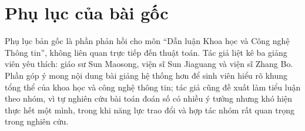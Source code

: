 \documentclass[11pt]{article}
\begin{document}
\appendix
\section{Phụ lục của bài gốc}

Phụ lục bản gốc là phần phản hồi cho môn ``Dẫn luận Khoa học và Công nghệ
Thông tin'', không liên quan trực tiếp đến thuật toán. Tác giả liệt kê ba
giảng viên yêu thích: giáo sư Sun Maosong, viện sĩ Sun Jiaguang và viện sĩ
Zhang Bo. Phần góp ý mong nội dung bài giảng hệ thống hơn để sinh viên hiểu rõ
khung tổng thể của khoa học và công nghệ thông tin; tác giả cũng đề xuất làm
tiểu luận theo nhóm, vì tự nghiên cứu bài toán đoán số có nhiều ý tưởng nhưng
khó hiện thực hết một mình, trong khi năng lực trao đổi và hợp tác nhóm rất
quan trọng trong nghiên cứu.
\end{document}

